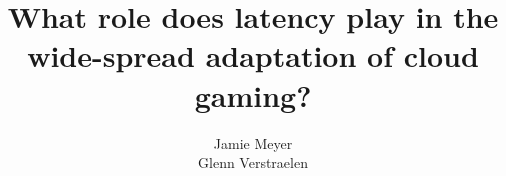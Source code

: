 \documentclass[]{report}
\title{What role does latency play in the wide-spread adaptation of cloud gaming?}
\author{Jamie Meyer \\ Glenn Verstraelen}
\begin{document}
\maketitle

\begin{abstract}
\end{abstract}
\end{document}
